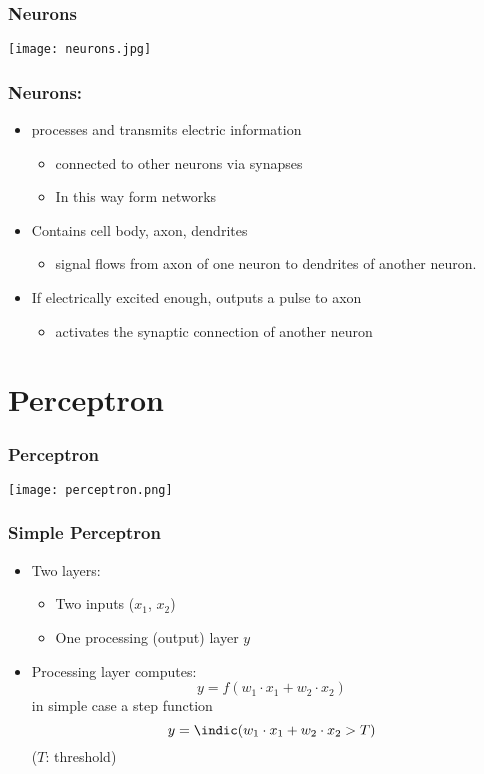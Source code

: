 \documentclass[mathserif]{beamer}
\begin{document}
\begin{frame}
  \frametitle{Neurons}
  \begin{center}
    \texttt{[image: neurons.jpg]}
  \end{center}
\end{frame}

\begin{frame}
  \frametitle{Neurons:}
  \begin{itemize}
  \item processes and transmits electric information
    \begin{itemize}
    \item connected to other neurons via synapses
    \item In this way form networks
    \end{itemize}
  \item Contains cell body, axon, dendrites
    \begin{itemize}
    \item signal flows from axon of one neuron to dendrites of another
      neuron. 
    \end{itemize}
  \item If electrically excited enough, outputs a pulse to axon
    \begin{itemize}
    \item activates the synaptic connection of another neuron
    \end{itemize}
  \end{itemize}
\end{frame}

\section{Perceptron}

\begin{frame}
  \frametitle{Perceptron}
  \texttt{[image: perceptron.png]}
\end{frame}

\begin{frame}
  \frametitle{Simple Perceptron}
  \begin{itemize}
  \item Two layers:
    \begin{itemize}
    \item Two inputs ($x_{1}$, $x_{2}$)
    \item One processing (output) layer $y$
    \end{itemize}
  \item Processing layer computes:
    \begin{equation*}
      y = f(w_{1} \cdot x_{1} + w_{2} \cdot x_{2})
    \end{equation*}
    in simple case a step function
    \begin{equation*}
      y = \indic(w_{1} \cdot x_{1} + w_{2} \cdot x_{2} > T)
    \end{equation*}
    ($T$: threshold) 
  \end{itemize}
\end{frame}
\end{document}
